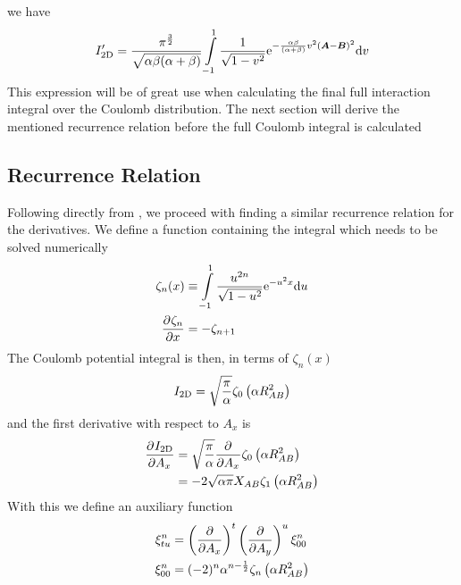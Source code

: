     we have
        \begin{equation}
            I'_{\text{2D}} =
            \frac{\pi^{\frac{3}{2}}}{\sqrt{\alpha\beta(\alpha+\beta)}}
            \int\limits^{1}_{-1} \frac{1}{\sqrt{1 - v^2}}
            \mathrm{e}^{-\frac{\alpha\beta}{(\alpha + \beta)}v^2(\boldsymbol{{A}}-\boldsymbol{{B}})^2}
            \mathrm{d} v
            \label{eq:coulombInteractionSimpleFinal}
        \end{equation}
    This expression will be of great use when calculating the final full
    interaction integral over the Coulomb distribution. The next section will
    derive the mentioned recurrence relation before the full Coulomb integral
    is calculated

\subsection{Recurrence Relation\label{sub:445}}
    Following directly from \cite{HelgakerTaylorGauss}, we proceed with finding
    a similar recurrence relation for the derivatives. We define a function
    containing the integral which needs to be solved numerically
        \begin{equation}
            \begin{aligned}
                \zeta_n(x) &\equiv \int\limits^1_{-1} \frac{u^{2n}}{\sqrt{1 -
                u^2}} \me^{-u^2x} \md u \\
                \prd{x}[\zeta_n] &= -\zeta_{n+1}
            \end{aligned}
            \label{eq:zetaDef}
        \end{equation}
    The Coulomb potential integral is then, in terms of $\zeta_n(x)$
        \begin{equation}
            I_{\text{2D}} = \sqrt{\frac{\pi}{\alpha}} \zeta_0\left(\alpha
            R^2_{AB}\right)
        \end{equation}
    and the first derivative with respect to $A_x$ is
        \begin{align}
            \prd{A_x}[\twoDI] &= \sqrt{\frac{\pi}{\alpha}} \prd{A_x}
            \zeta_0\left(\alpha R^2_{AB}\right) \nonumber \\
            &= -2\sqrt{\alpha\pi}X_{AB}\zeta_1\left(\alpha R^2_{AB}\right)
        \end{align}
    With this we define an auxiliary function
        \begin{equation}
            \begin{aligned}
                \xi^n_{tu} &=\left(\frac{\mathrm{\partial}}{\mathrm{\partial} A_x}\right)^{t}\left(\frac{\mathrm{\partial}}{\mathrm{\partial} A_y}\right)^{u} \xi^n_{00} \\
                \xi^n_{00} &= (-2)^n\alpha^{n-\frac{1}{2}} \zeta_n\left(\alpha
                R^2_{AB}\right)
            \end{aligned}
            \label{eq:auxiliary2d1}
        \end{equation}
